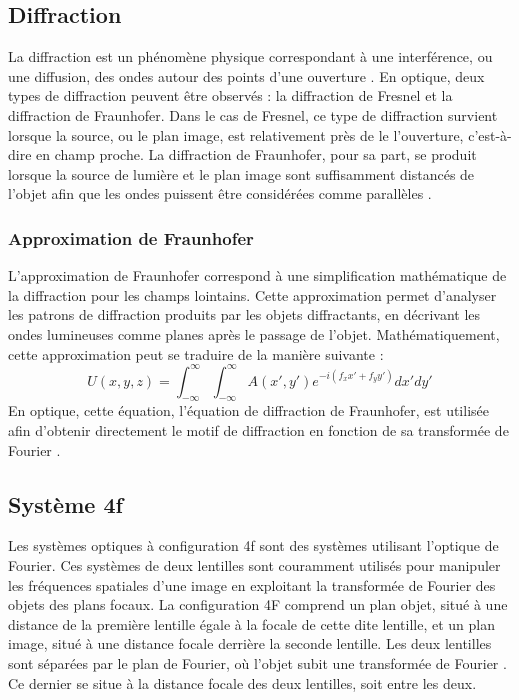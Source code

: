 \documentclass[11pt,letterpaper]{article}
\begin{document}
\subsection{Diffraction}
La diffraction est un phénomène physique correspondant à une interférence, ou une diffusion, des ondes autour des points d'une ouverture \cite{abramowitz_diffraction_2024}. En optique, deux types de diffraction peuvent être observés : la diffraction de Fresnel et la diffraction de Fraunhofer. Dans le cas de Fresnel, ce type de diffraction survient lorsque la source, ou le plan image, est relativement près de le l'ouverture, c'est-à-dire en champ proche. La diffraction de Fraunhofer, pour sa part, se produit lorsque la source de lumière et le plan image sont suffisamment distancés de l'objet afin que les ondes puissent être considérées comme parallèles \cite{petrosyan_fourier_2024}.

\subsubsection{Approximation de Fraunhofer}
L'approximation de Fraunhofer correspond à une simplification mathématique de la diffraction pour les champs lointains. Cette approximation permet d'analyser les patrons de diffraction produits par les objets diffractants, en décrivant les ondes lumineuses comme planes après le passage de l'objet. Mathématiquement, cette approximation peut se traduire de la manière suivante :
\begin{equation}
  U(x,y,z)=\int_{-\infty}^{\infty}\int_{-\infty}^{\infty}A(x',y')e^{-i(f_{x}x'+f_{y}y')}dx'dy'
\end{equation}
En optique, cette équation, l'équation de diffraction de Fraunhofer, est utilisée afin d'obtenir directement le motif de diffraction en fonction de sa transformée de Fourier \cite{noauthor_fresnel_2022}. 

\subsection{Système 4f}
Les systèmes optiques à configuration 4f sont des systèmes utilisant l'optique de Fourier. Ces systèmes de deux lentilles sont couramment utilisés pour manipuler les fréquences spatiales d'une image en exploitant la transformée de Fourier des objets des plans focaux. La configuration 4F comprend un plan objet, situé à une distance de la première lentille égale à la focale de cette dite lentille, et un plan image, situé à une distance focale derrière la seconde lentille. Les deux lentilles sont séparées par le plan de Fourier, où l'objet subit une transformée de Fourier \cite{argueta_deciphering_2024}. Ce dernier se situe à la distance focale des deux lentilles, soit entre les deux.
\end{document}
